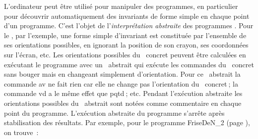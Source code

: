 {\begin{minipage}{\myparboxwidth}
L'ordinateur peut être utilisé pour manipuler des programmes, en
particulier pour découvrir automatiquement des invariants de forme
simple en chaque point d'un programme. C'est l'objet de 
l'{\em interprétation abstraite} des programmes
\cite{CousotIA}. Pour le \robot, par l'exemple, une forme simple
d'invariant est constituée par l'ensemble de ses orientations possibles, 
en ignorant la position de son crayon, ses coordonnées sur 
l'écran, etc. Les orientations possibles du \robot\ concret peuvent être
calculées en exécutant le programme avec un \robot\ abstrait qui
exécute les commandes du \robot\ concret sans bouger
mais en changeant simplement d'orientation. Pour ce \robot\ abstrait
la commande {\idt av} ne fait rien car elle ne change pas l'orientation du
\robot\ concret$\:$; la commande {\idt vd} a le même effet que 
{\idt pqtd}$\:$; etc. Pendant l'exécution abstraite les orientations 
possibles du \robot\ abstrait sont notées comme commentaire
en chaque point du programme. L'exécution abstraite du programme
s'arrête après stabilisation des résultats. Par exemple, pour le programme {\idt FriseDeN\_2} (page 
\pageref{prog:FriseDeN_2}), on trouve~:
\vspace{\abovedisplayskip}
\end{minipage}
}

\noindent {}

